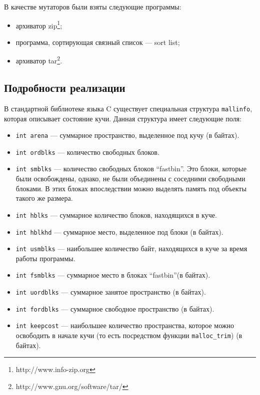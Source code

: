 \documentclass[12pt,a4paper]{article}
\begin{document}
   В качестве мутаторов были взяты следующие программы:
   \begin{itemize}
        \item архиватор zip\footnote{http://www.info-zip.org};
   	    \item программа, сортирующая связный список --- sort list;
   	    \item архиватор tar\footnote{http://www.gnu.org/software/tar/}.
   \end{itemize}
   
   \subsection{Подробности реализации}
   
   В стандартной библиотеке языка C существует специальная структура \texttt{mallinfo}, которая описывает состояние кучи. Данная структура имеет следующие поля: 
   \begin{itemize}
   	     \item \texttt{int arena} --- суммарное пространство, выделенное под кучу (в байтах).
         \item \texttt{int ordblks} --- количество свободных блоков.
         \item \texttt{int smblks} --- количество свободных блоков \textquotedblleft fastbin\textquotedblright. Это блоки, которые были освобождены,
         однако, не были объединены с соседними свободными блоками. В этих блоках впоследствии можно 
         выделять память под объекты такого же размера.
          \item \texttt{int hblks} --- суммарное количество блоков, находящихся в куче.
          \item \texttt{int hblkhd} --- суммарное место, выделенное под блоки (в байтах).
          \item \texttt{int usmblks} --- наибольшее количество байт, находящихся в куче за время работы программы.
          \item \texttt{int fsmblks} --- суммарное место в блоках \textquotedblleft fastbin\textquotedblright (в байтах).
          \item \texttt{int uordblks} --- суммарное занятое пространство (в байтах).
          \item \texttt{int fordblks} --- суммарное свободное пространство (в байтах).
          \item \texttt{int keepcost} --- наибольшее количество пространства, которое можно освободить в начале кучи 
          (то есть посредством функции \texttt{malloc\_trim}) (в байтах).
   \end{itemize}
   
\end{document}
